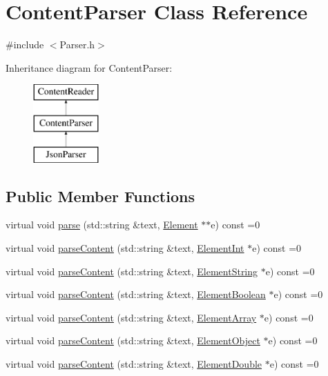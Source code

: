 \hypertarget{classContentParser}{}\section{Content\+Parser Class Reference}
\label{classContentParser}


{\ttfamily \#include $<$Parser.\+h$>$}

Inheritance diagram for Content\+Parser\+:\begin{figure}[H]
\begin{center}
\leavevmode
\includegraphics[height=3.000000cm]{classContentParser}
\end{center}
\end{figure}
\subsection*{Public Member Functions}
\begin{DoxyCompactItemize}
\item 
virtual void \mbox{\hyperlink{classContentReader_a7fff2e63a2e8fa216665604f69974e1d}{parse}} (std\+::string \&text, \mbox{\hyperlink{classElement}{Element}} $\ast$$\ast$e) const =0
\item 
virtual void \mbox{\hyperlink{classContentReader_a7eef37b8b9761e21c0a3907ff94c72f7}{parse\+Content}} (std\+::string \&text, \mbox{\hyperlink{classElementInt}{Element\+Int}} $\ast$e) const =0
\item 
virtual void \mbox{\hyperlink{classContentReader_a310678ddc37a05aca2f13db73b22abe5}{parse\+Content}} (std\+::string \&text, \mbox{\hyperlink{classElementString}{Element\+String}} $\ast$e) const =0
\item 
virtual void \mbox{\hyperlink{classContentReader_a3ee0aec579c723f17742e10fe7c75e39}{parse\+Content}} (std\+::string \&text, \mbox{\hyperlink{classElementBoolean}{Element\+Boolean}} $\ast$e) const =0
\item 
virtual void \mbox{\hyperlink{classContentReader_a91fdd738983dcc7a246c3c163007dfa9}{parse\+Content}} (std\+::string \&text, \mbox{\hyperlink{classElementArray}{Element\+Array}} $\ast$e) const =0
\item 
virtual void \mbox{\hyperlink{classContentReader_a59a8de2bf3436e46b4d029a9b3c3c9da}{parse\+Content}} (std\+::string \&text, \mbox{\hyperlink{classElementObject}{Element\+Object}} $\ast$e) const =0
\item 
virtual void \mbox{\hyperlink{classContentReader_ab4ba739ee5241848ae8af86e64e43a40}{parse\+Content}} (std\+::string \&text, \mbox{\hyperlink{classElementDouble}{Element\+Double}} $\ast$e) const =0
\end{DoxyCompactItemize}


